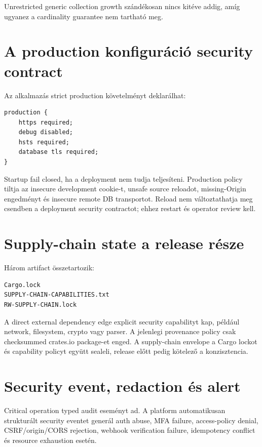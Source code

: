 Unrestricted generic collection growth szándékosan nincs kitéve addig, amíg ugyanez a cardinality guarantee nem tartható meg.

\section{A production konfiguráció security contract}

Az alkalmazás strict production követelményt deklarálhat:

\begin{lstlisting}[language=RWLang]
production {
    https required;
    debug disabled;
    hsts required;
    database tls required;
}
\end{lstlisting}

Startup fail closed, ha a deployment nem tudja teljesíteni. Production policy tiltja az insecure development cookie-t, unsafe source reloadot, missing-Origin engedményt és insecure remote DB transportot. Reload nem változtathatja meg csendben a deployment security contractot; ehhez restart és operator review kell.

\section{Supply-chain state a release része}

Három artifact összetartozik:

\begin{lstlisting}
Cargo.lock
SUPPLY-CHAIN-CAPABILITIES.txt
RW-SUPPLY-CHAIN.lock
\end{lstlisting}

A direct external dependency edge explicit security capabilityt kap, például network, filesystem, crypto vagy parser. A jelenlegi provenance policy csak checksummed crates.io package-et enged. A supply-chain envelope a Cargo lockot és capability policyt együtt sealeli, release előtt pedig kötelező a  konzisztencia.

\section{Security event, redaction és alert}

Critical operation typed audit eseményt ad. A platform automatikusan strukturált security eventet generál auth abuse, MFA failure, access-policy denial, CSRF/origin/CORS rejection, webhook verification failure, idempotency conflict és resource exhaustion esetén.

